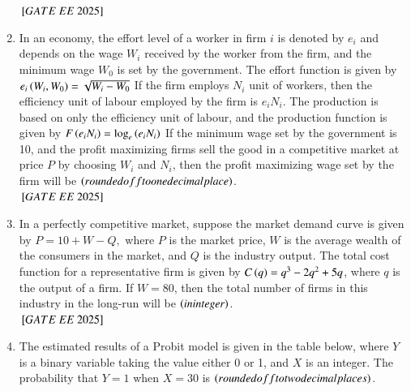 \documentclass[journal,12pt,onecolumn]{IEEEtran}
\theoremstyle{remark}
\begin{document}
\begin{enumerate}
\begin{center}
\begin{tabular}{|l|c|c|c|}
\hline
\end{tabular}
\end{center}
 \hfill ${}\left[GATE\ EE\ 2025\right]$
\item In an economy, the effort level of a worker in firm $i$ is denoted by $e_i$ and depends on the wage $W_i$ received by the worker from the firm, and the minimum wage $W_0$ is set by the government. The effort function is given by 
$
e_i\left(W_i, W_0\right) = \sqrt{W_i - W_0}
$
If the firm employs $N_i$ unit of workers, then the efficiency unit of labour employed by the firm is $e_i N_i$. The production is based on only the efficiency unit of labour, and the production function is given by
$
F\left(e_i N_i\right) = \log_e \left(e_i N_i\right)
$
If the minimum wage set by the government is 10, and the profit maximizing firms sell the good in a competitive market at price $P$ by choosing $W_i$ and $N_i$, then the profit maximizing wage set by the firm will be \underline{\hspace{2cm}} $\left(rounded off to one decimal place\right)$.\\
 \hfill ${}\left[GATE\ EE\ 2025\right]$
\item In a perfectly competitive market, suppose the market demand curve is given by 
$
P = 10 + W - Q,
$
where $P$ is the market price, $W$ is the average wealth of the consumers in the market, and $Q$ is the industry output. The total cost function for a representative firm is given by $C\left(q\right) = q^3 - 2q^2 + 5q$, where $q$ is the output of a firm. If $W = 80$, then the total number of firms in this industry in the long-run will be \underline{\hspace{2cm}} $\left(in integer\right)$.
\\
 \hfill ${}\left[GATE\ EE\ 2025\right]$
\item The estimated results of a Probit model is given in the table below, where $Y$ is a binary variable taking the value either 0 or 1, and $X$ is an integer. The probability that $Y = 1$ when $X = 30$ is \underline{\hspace{2cm}} $\left(rounded off to two decimal places\right)$.


\end{enumerate}
\end{document}
